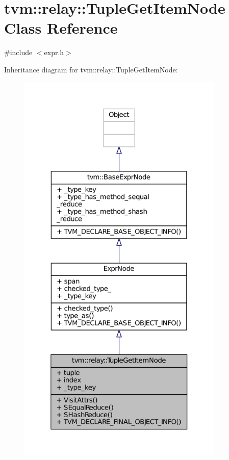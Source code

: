\hypertarget{classtvm_1_1relay_1_1TupleGetItemNode}{}\section{tvm\+:\+:relay\+:\+:Tuple\+Get\+Item\+Node Class Reference}
\label{classtvm_1_1relay_1_1TupleGetItemNode}


{\ttfamily \#include $<$expr.\+h$>$}



Inheritance diagram for tvm\+:\+:relay\+:\+:Tuple\+Get\+Item\+Node\+:
\nopagebreak
\begin{figure}[H]
\begin{center}
\leavevmode
\includegraphics[height=550pt]{classtvm_1_1relay_1_1TupleGetItemNode__inherit__graph}
\end{center}
\end{figure}


